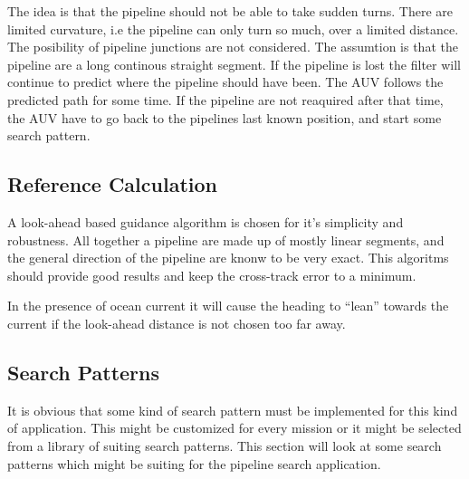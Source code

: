 		The idea is that the pipeline should not be able to take sudden turns. There are limited
		curvature, i.e the pipeline can only turn so much, over a limited distance. The posibility of
		pipeline junctions are not considered. The assumtion is that the pipeline are a long continous
		straight segment. If the pipeline is lost the filter will continue to predict where the
		pipeline should have been. The AUV follows the predicted path for some time. If the pipeline
		are not reaquired after that time, the AUV have to go back to the pipelines last known
		position, and start some search pattern.

		
	

	\subsection{Reference Calculation}
		A look-ahead based guidance algorithm is chosen for it's simplicity and robustness. All
		together a pipeline are made up of mostly linear segments, and the general direction of the
		pipeline are knonw to be very exact. This algoritms should provide good results and keep 
		the cross-track error to a minimum.

		In the presence of ocean current it will cause the heading to ``lean'' towards the current if
		the look-ahead distance is not chosen too far away. 
		
	
	\subsection{Search Patterns}
		\label{subsec:ch2_searchpattern}
		It is obvious that some kind of search pattern must be implemented for this kind of
		application. This might be customized for every mission or it might be selected from a library
		of suiting search patterns. 
		This section will look at some search patterns which might be suiting for the pipeline search
		application.

